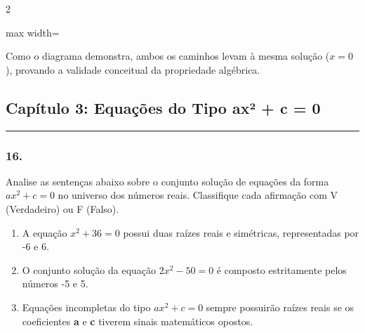 \begin{multicols*}{2}
\begin{tcolorbox}[colback=CorTitUm!5, colframe=CorTitUm, boxrule=1pt, arc=4pt, left=6pt, right=6pt, top=6pt, bottom=6pt]
\begin{center}
\begin{adjustbox}{max width=\linewidth}
    \end{adjustbox}
    \end{center}
    \vspace{0.1cm}
    Como o diagrama demonstra, ambos os caminhos levam à mesma solução ($x=0$), provando a validade conceitual da propriedade algébrica.
    \end{tcolorbox}
\fi

\par\vspace{\espacoQuestao}
\subsection*{Capítulo 3: Equações do Tipo ax² + c = 0}
\vspace{-0.2cm}\noindent\rule{\linewidth}{1.5pt} 
\par\vspace{\espacoPosTitulo}
\subsubsection*{16.} Analise as sentenças abaixo sobre o conjunto solução de equações da forma $ ax^2 + c = 0 $ no universo dos números reais. Classifique cada afirmação com V (Verdadeiro) ou F (Falso).
\begin{enumerate}[label=\Roman*., itemsep=\espacoAlt]
    \item A equação $ x^2 + 36 = 0 $ possui duas raízes reais e simétricas, representadas por -6 e 6.
    \item O conjunto solução da equação $ 2x^2 - 50 = 0 $ é composto estritamente pelos números -5 e 5.
    \item Equações incompletas do tipo $ ax^2 + c = 0 $ sempre possuirão raízes reais se os coeficientes \textbf{a} e \textbf{c} tiverem sinais matemáticos opostos.
\end{enumerate}


\end{multicols*}
